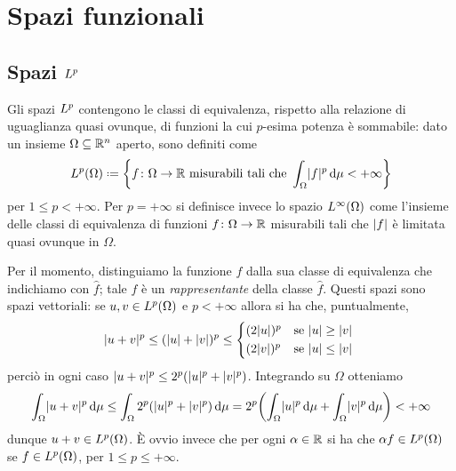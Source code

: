 \chapter{Spazi funzionali}
\label{ch:spazi-funzionali}

\section{Spazi $\lclass[p]$}
\label{sec:spazi-lp}
Gli spazi $\lclass[p]$ contengono le classi di equivalenza, rispetto alla relazione di uguaglianza quasi ovunque, di funzioni la cui $p$-esima potenza è sommabile: dato un insieme $\Omega\subseteq\R^n$ aperto, sono definiti come
\begin{equation*}
    \leb[p]{\Omega}\defeq\biggl\{f\colon\Omega\to\R\text{ misurabili tali che }\int_\Omega\abs{f}^p\,\dd\mu<+\infty\biggr\}
\end{equation*}
per $1\le p<+\infty$.
Per $p=+\infty$ si definisce invece lo spazio $\leb[\infty]{\Omega}$ come l'insieme delle classi di equivalenza di funzioni $f\colon\Omega\to\R$ misurabili tali che $\abs{f}$ è limitata quasi ovunque in $\Omega$.

\newcommand{\eqc}[1]{\hat{#1}} %
Per il momento, distinguiamo la funzione $f$ dalla sua classe di equivalenza che indichiamo con $\eqc{f}$; tale $f$ è un \emph{rappresentante} della classe $\eqc{f}$.
Questi spazi sono spazi vettoriali: se $u,v\in\leb[p]{\Omega}$ e $p<+\infty$ allora si ha che, puntualmente, 
\begin{equation}
    \abs{u+v}^p\le(\abs{u}+\abs{v})^p\le
    \begin{cases*}
        (2\abs{u})^p & se $\abs{u}\ge\abs{v}$\\
        (2\abs{v})^p & se $\abs{u}\le\abs{v}$
    \end{cases*}
\end{equation}
perciò in ogni caso $\abs{u+v}^p\le 2^p(\abs{u}^p+\abs{v}^p)$.
Integrando su $\Omega$ otteniamo
\begin{equation}
    \int_\Omega \abs{u+v}^p\,\dd\mu\le
    \int_\Omega 2^p(\abs{u}^p+\abs{v}^p)\,\dd\mu=
    2^p\biggl(\int_\Omega \abs{u}^p\,\dd\mu + \int_\Omega \abs{v}^p\,\dd\mu\biggr)<+\infty
\end{equation}
dunque $u+v\in\leb[p]{\Omega}$.
È ovvio invece che per ogni $\alpha\in\R$ si ha che $\alpha f\in\leb[p]{\Omega}$ se $f\in\leb[p]{\Omega}$, per $1\le p\le+\infty$.

